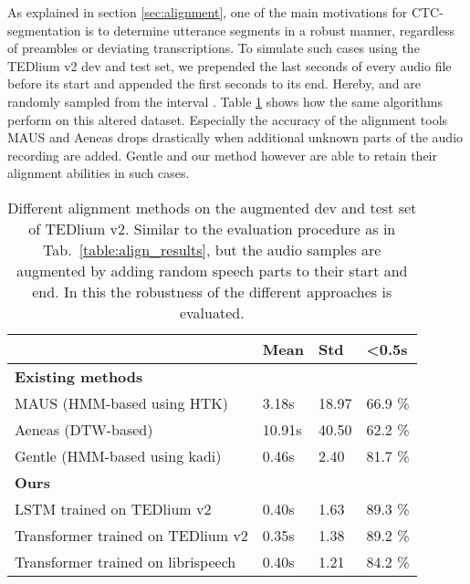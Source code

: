 \documentclass[runningheads]{llncs}
\begin{document}
As explained in section \ref{sec:alignment}, one of the main motivations for CTC-segmentation is to determine utterance segments in a robust manner, regardless of preambles or deviating transcriptions.
To simulate such cases using the TEDlium v2 dev and test set,
we prepended the last  seconds of every audio file before its start and appended the first  seconds to its end.
Hereby,  and  are randomly sampled from the interval .
Table \ref{table:align_results_augm} shows how the same algorithms perform on this altered dataset.
Especially the accuracy of the alignment tools MAUS and Aeneas drops drastically when additional unknown parts of the audio recording are added.
Gentle and our method however are able to retain their alignment abilities in such cases.


\begin{table}[tb!]
	\centering
	\caption{Different alignment methods on the augmented dev and test set of TEDlium v2.
	Similar to the evaluation procedure as in Tab.~\ref{table:align_results},
	but the audio samples are augmented by adding random speech parts to their start and end.
	In this the robustness of the different approaches is evaluated.}
	\begin{tabular}{l |l |l| l}\toprule
    & \textbf{Mean} & \textbf{Std} & \textbf{<0.5s}  \\ 
    \midrule
    \multicolumn{4}{l}{\textbf{Existing methods}} \\
    \midrule
	MAUS (HMM-based using HTK) & 3.18s & 18.97 & 66.9 \% \\
	Aeneas (DTW-based) & 10.91s & 40.50 & 62.2 \%\\
	Gentle (HMM-based using kadi) & 0.46s & 2.40 & 81.7 \%\\ 
	\midrule
	\multicolumn{4}{l}{\textbf{Ours}} \\
    \midrule
	LSTM trained on TEDlium v2 & 0.40s & 1.63 & 89.3 \% \\
	Transformer trained on TEDlium v2 & 0.35s & 1.38 & 89.2 \% \\
	Transformer trained on librispeech & 0.40s & 1.21 & 84.2 \% \\
	\bottomrule 
    \end{tabular}
\label{table:align_results_augm}
\end{table}
\end{document}
